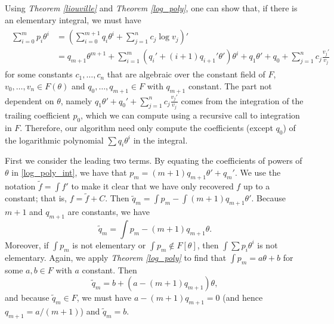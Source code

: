 \documentclass{article}
\theoremstyle{plain}
\theoremstyle{definition}
\newcommand{\thmref}[1]{\emph{Theorem \ref{#1}}}
\begin{document}
Using \thmref{liouville} and \thmref{log_poly}, one can show that, if there is
an elementary integral, we must have
\begin{align} \label{log_poly_int}
    \begin{split}
        \sum_{i = 0}^m p_i \theta^i
            & = \left(\sum_{i = 0}^{m + 1} q_i\theta^i
                + \sum_{j = 1}^n c_j \log v_j\right)' \\
            & = q_{m + 1}\theta^{m + 1}
                + \sum_{i = 1}^m (q_i' + (i + 1)q_{i + 1}' \theta') \theta^i
                + q_1 \theta' + q_0 + \sum_{j = 1}^n c_j \frac {v_j'} {v_j}
    \end{split}
\end{align}
for some constants $c_1, \dots, c_n$ that are algebraic over the constant field
of $F$, $v_0, \dots, v_n \in F(\theta)$ and $q_0, \dots, q_{m + 1} \in F$ with
$q_{m+1}$ constant. The part not dependent on $\theta$, namely $q_1\theta' +
q_0' + \sum_{j = 1}^n c_j \frac {v_j'} {v_j}$ comes from the integration of the
trailing coefficient $p_0$, which we can compute using a recursive call to
integration in $F$. Therefore, our algorithm need only compute the
coefficients (except $q_0$) of the logarithmic polynomial $\sum q_i
\theta^i$ in the integral. \medbreak

First we consider the leading two terms. By equating the coefficients of powers of
$\theta$ in \eqref{log_poly_int}, we have that $p_m = (m + 1)q_{m + 1}\theta' +
q_m'$. We use the notation $\tilde f = \int f'$ to make it clear that we have
only recovered $f$ up to a constant; that is, $f = \tilde f + C$. Then $\tilde
q_m = \int p_m - \int (m + 1) q_{m + 1} \theta'$. Because $m + 1$ and
$q_{m + 1}$ are constants, we have
\begin{equation}
    \tilde q_m = \int p_m - (m + 1) q_{m + 1} \theta.
\end{equation}
Moreover, if $\int p_m$ is not elementary or $\int p_m \not \in F[\theta]$, then
$\int \sum p_i \theta^i$ is not elementary. Again, we apply \thmref{log_poly} to
find that $\int p_m = a\theta + b$ for some $a, b \in F$ with $a$ constant. Then
\begin{equation}
    \tilde q_m = b + (a - (m + 1) q_{m + 1})\theta,
\end{equation}
and because $\tilde q_m \in F$, we must have $a - (m + 1) q_{m + 1} = 0$ (and
hence $q_{m + 1} = a/(m + 1)$) and $\tilde q_m = b$. \medbreak
\end{document}
